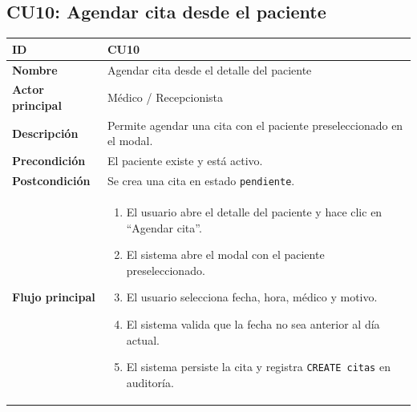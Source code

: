 \documentclass[11pt,a4paper]{article}
\begin{document}
\subsection*{CU10: Agendar cita desde el paciente}
\begin{longtable}{|L{3.5cm}|L{10cm}|}
    \hline
    \textbf{ID}              & CU10                                                                  \\ \hline
    \textbf{Nombre}          & Agendar cita desde el detalle del paciente                            \\ \hline
    \textbf{Actor principal} & Médico / Recepcionista                                                \\ \hline
    \textbf{Descripción}     & Permite agendar una cita con el paciente preseleccionado en el modal. \\ \hline
    \textbf{Precondición}    & El paciente existe y está activo.                                     \\ \hline
    \textbf{Postcondición}   & Se crea una cita en estado \texttt{pendiente}.                        \\ \hline
    \textbf{Flujo principal} &
    \begin{enumerate}
        \item El usuario abre el detalle del paciente y hace clic en ``Agendar cita''.
        \item El sistema abre el modal con el paciente preseleccionado.
        \item El usuario selecciona fecha, hora, médico y motivo.
        \item El sistema valida que la fecha no sea anterior al día actual.
        \item El sistema persiste la cita y registra \texttt{CREATE citas} en auditoría.
    \end{enumerate}              \\ \hline
\end{longtable}

\end{document}
